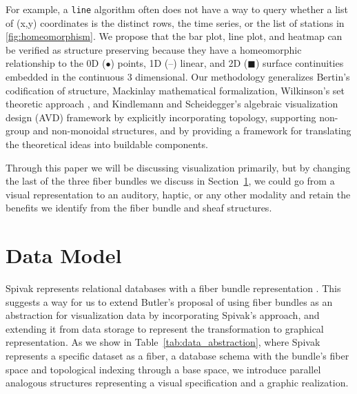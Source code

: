 \documentclass[preprint]{vgtc}
\begin{document}
For example, a \texttt{line} algorithm often does not have a way to query whether a list of (x,y) coordinates is the distinct rows, the time series, or the list of stations in \autoref{fig:homeomorphism}. We propose that the bar plot, line plot, and heatmap can be verified as structure preserving because they have a homeomorphic relationship to the 0D ($\bullet$) points, 1D (--) linear, and 2D ($\blacksquare$) surface continuities embedded in the continuous 3 dimensional. Our methodology generalizes Bertin\cite{bertinSemiologyGraphicsDiagrams2011}'s codification of structure,  Mackinlay\cite{mackinlayAutomaticDesignGraphical1987} mathematical formalization, Wilkinson's set theoretic approach \cite{wilkinsonGrammarGraphics2005}, and Kindlemann and Scheidegger's algebraic visualization design (AVD) framework \cite{kindlmannAlgebraicProcessVisualization2014} by explicitly incorporating topology, supporting non-group and non-monoidal structures, and by providing a framework for translating the theoretical ideas into buildable components.

Through this paper we will be discussing visualization primarily, but by changing the last of the three fiber bundles we discuss in Section~\ref{sec:data models}, we could go from a visual representation to an auditory, haptic, or any other modality and retain the benefits we identify from the fiber bundle and sheaf structures.


\section{Data Model}
\label{sec:data models}

Spivak represents relational databases with a fiber bundle representation \cite{spivakDatabasesAreCategories2010,spivakSimplicialDatabases2009}. This suggests a way for us to extend Butler's proposal of using fiber bundles as an abstraction for visualization data \cite{butlerVectorBundleClassesForm1992,butlerVisualizationModelBased1989} by incorporating Spivak's approach, and extending it from data storage to represent the transformation to graphical representation. As we show in Table~\ref{tab:data_abstraction}, where Spivak represents a specific dataset as a fiber, a database schema with the bundle's fiber space and topological indexing through a base space, we introduce parallel analogous structures representing a visual specification and a graphic realization.
\end{document}
